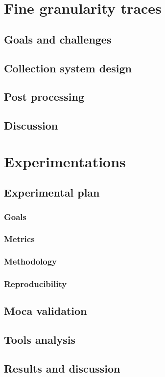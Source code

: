 
\section{Fine granularity traces}

\subsection{Goals and challenges}

\subsection{Collection system design}

\subsection{Post processing}

\subsection{Discussion}

\section{Experimentations}


\subsection{Experimental plan}

\subsubsection{Goals}
\subsubsection{Metrics}
\subsubsection{Methodology}
\subsubsection{Reproducibility}

\subsection{Moca validation}

\subsection{Tools analysis}

\subsection{Results and discussion}


